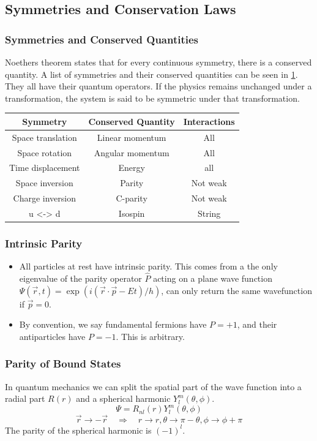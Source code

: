 \subsection{Symmetries and Conservation Laws}
\subsubsection{Symmetries and Conserved Quantities}
Noethers theorem states that for every continuous symmetry, there is a conserved quantity. A list of symmetries and their conserved quantities can be seen in \cref{tab: symmetries_table}. They all have their quantum operators. If the physics remains unchanged under a transformation, the system is said to be symmetric under that transformation.

\begin{table}[h!]
\centering
\begin{tabular}{ |c|c|c| }
    \hline
    \textbf{Symmetry} &\textbf{Conserved Quantity} &\textbf{Interactions} \\ 
    \hline
    Space translation &Linear momentum &All \\ 
    Space rotation &Angular momentum &All \\ 
    Time displacement &Energy &all \\ 
    Space inversion &Parity &Not weak \\ 
    Charge inversion &C-parity &Not weak \\ 
    u <-> d &Isospin &String \\ 
    \hline
    \end{tabular}\label{tab: symmetries_table}
\end{table}

\subsubsection{Intrinsic Parity}
\begin{itemize}
    \item All particles at rest have intrinsic parity. This comes from a the only eigenvalue of the parity operator $\hat{P}$ acting on a plane wave function $Ψ(\vec{r},t) = \exp \left(i(\vec{r} ⋅ \vec{p} - Et) / h\right)$, can only return the same wavefunction if $\vec{p} = 0$. 
    \item By convention, we say fundamental fermions have $P = +1$, and their antiparticles have $P = -1$. This is arbitrary. 
\end{itemize}

\subsubsection{Parity of Bound States}
In quantum mechanics we can split the spatial part of the wave function into a radial part $R(r)$ and a spherical harmonic $Y_{l}^{m}(\theta, \phi)$. 
\begin{equation}
Ψ = R_{nl}(r) Y_{l}^{m}(\theta, \phi)
\end{equation}
\begin{equation}
\vec{r} → - \vec{r} \quad ⇒ \quad  r → r, θ → π - θ, ϕ → ϕ + π
\end{equation}
The parity of the spherical harmonic is $(-1)^{l}$. 

